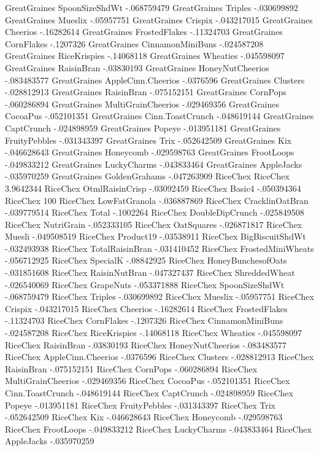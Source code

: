 GreatGraines	SpoonSizeShdWt	-.068759479
GreatGraines	Triples	-.030699892
GreatGraines	Mueslix	-.05957751
GreatGraines	Crispix	-.043217015
GreatGraines	Cheerios	-.16282614
GreatGraines	FrostedFlakes	-.11324703
GreatGraines	CornFlakes	-.1207326
GreatGraines	CinnamonMiniBuns	-.024587208
GreatGraines	RiceKrispies	-.14068118
GreatGraines	Wheaties	-.045598097
GreatGraines	RaisinBran	-.03830193
GreatGraines	HoneyNutCheerios	-.083483577
GreatGraines	AppleCinn.Cheerios	-.0376596
GreatGraines	Clusters	-.028812913
GreatGraines	RaisinBran	-.075152151
GreatGraines	CornPops	-.060286894
GreatGraines	MultiGrainCheerios	-.029469356
GreatGraines	CocoaPus	-.052101351
GreatGraines	Cinn.ToastCrunch	-.048619144
GreatGraines	CaptCrunch	-.024898959
GreatGraines	Popeye	-.013951181
GreatGraines	FruityPebbles	-.031343397
GreatGraines	Trix	-.052642509
GreatGraines	Kix	-.046628643
GreatGraines	Honeycomb	-.029598763
GreatGraines	FrootLoops	-.049833212
GreatGraines	LuckyCharms	-.043833464
GreatGraines	AppleJacks	-.035970259
GreatGraines	GoldenGrahams	-.047263909
RiceChex	RiceChex	3.9642344
RiceChex	OtmlRaisinCrisp	-.03092459
RiceChex	Basic4	-.050394364
RiceChex	100%
RiceChex	LowFatGranola	-.036887869
RiceChex	CracklinOatBran	-.039779514
RiceChex	Total	-.1002264
RiceChex	DoubleDipCrunch	-.025849508
RiceChex	NutriGrain	-.052333105
RiceChex	OatSquares	-.026871817
RiceChex	Muesli	-.049508519
RiceChex	Product19	-.03538911
RiceChex	BigBiscuitShdWt	-.032493938
RiceChex	TotalRaisinBran	-.031410452
RiceChex	FrostedMiniWheats	-.056712925
RiceChex	SpecialK	-.08842925
RiceChex	HoneyBunchesofOats	-.031851608
RiceChex	RaisinNutBran	-.047327437
RiceChex	ShreddedWheat	-.026540069
RiceChex	GrapeNuts	-.053371888
RiceChex	SpoonSizeShdWt	-.068759479
RiceChex	Triples	-.030699892
RiceChex	Mueslix	-.05957751
RiceChex	Crispix	-.043217015
RiceChex	Cheerios	-.16282614
RiceChex	FrostedFlakes	-.11324703
RiceChex	CornFlakes	-.1207326
RiceChex	CinnamonMiniBuns	-.024587208
RiceChex	RiceKrispies	-.14068118
RiceChex	Wheaties	-.045598097
RiceChex	RaisinBran	-.03830193
RiceChex	HoneyNutCheerios	-.083483577
RiceChex	AppleCinn.Cheerios	-.0376596
RiceChex	Clusters	-.028812913
RiceChex	RaisinBran	-.075152151
RiceChex	CornPops	-.060286894
RiceChex	MultiGrainCheerios	-.029469356
RiceChex	CocoaPus	-.052101351
RiceChex	Cinn.ToastCrunch	-.048619144
RiceChex	CaptCrunch	-.024898959
RiceChex	Popeye	-.013951181
RiceChex	FruityPebbles	-.031343397
RiceChex	Trix	-.052642509
RiceChex	Kix	-.046628643
RiceChex	Honeycomb	-.029598763
RiceChex	FrootLoops	-.049833212
RiceChex	LuckyCharms	-.043833464
RiceChex	AppleJacks	-.035970259
